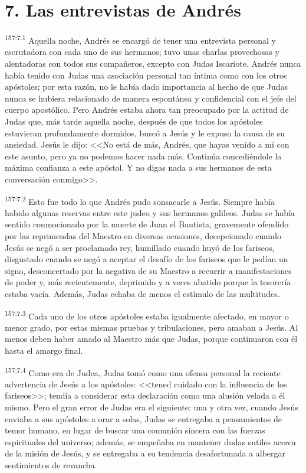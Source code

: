 \section*{7. Las entrevistas de Andrés}
\par 
\textsuperscript{157:7.1} Aquella noche, Andrés se encargó de tener una entrevista personal y escrutadora con cada uno de sus hermanos; tuvo unas charlas provechosas y alentadoras con todos sus compañeros, excepto con Judas Iscariote. Andrés nunca había tenido con Judas una asociación personal tan íntima como con los otros apóstoles; por esta razón, no le había dado importancia al hecho de que Judas nunca se hubiera relacionado de manera espontánea y confidencial con el jefe del cuerpo apostólico. Pero Andrés estaba ahora tan preocupado por la actitud de Judas que, más tarde aquella noche, después de que todos los apóstoles estuvieran profundamente dormidos, buscó a Jesús y le expuso la causa de su ansiedad. Jesús le dijo: <<No está de más, Andrés, que hayas venido a mí con este asunto, pero ya no podemos hacer nada más. Continúa concediéndole la máxima confianza a este apóstol. Y no digas nada a sus hermanos de esta conversación conmigo>>.

\par 
\textsuperscript{157:7.2} Esto fue todo lo que Andrés pudo sonsacarle a Jesús. Siempre había habido algunas reservas entre este judeo y sus hermanos galileos. Judas se había sentido conmocionado por la muerte de Juan el Bautista, gravemente ofendido por las reprimendas del Maestro en diversas ocasiones, decepcionado cuando Jesús se negó a ser proclamado rey, humillado cuando huyó de los fariseos, disgustado cuando se negó a aceptar el desafío de los fariseos que le pedían un signo, desconcertado por la negativa de su Maestro a recurrir a manifestaciones de poder y, más recientemente, deprimido y a veces abatido porque la tesorería estaba vacía. Además, Judas echaba de menos el estímulo de las multitudes.

\par 
\textsuperscript{157:7.3} Cada uno de los otros apóstoles estaba igualmente afectado, en mayor o menor grado, por estas mismas pruebas y tribulaciones, pero amaban a Jesús. Al menos deben haber amado al Maestro más que Judas, porque continuaron con él hasta el amargo final.

\par 
\textsuperscript{157:7.4} Como era de Judea, Judas tomó como una ofensa personal la reciente advertencia de Jesús a los apóstoles: <<tened cuidado con la influencia de los fariseos>>; tendía a considerar esta declaración como una alusión velada a él mismo. Pero el gran error de Judas era el siguiente: una y otra vez, cuando Jesús enviaba a sus apóstoles a orar a solas, Judas se entregaba a pensamientos de temor humano, en lugar de buscar una comunión sincera con las fuerzas espirituales del universo; además, se empeñaba en mantener dudas sutiles acerca de la misión de Jesús, y se entregaba a su tendencia desafortunada a albergar sentimientos de revancha.

